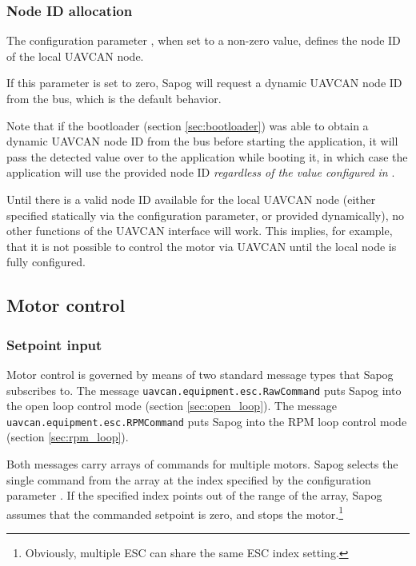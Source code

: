 \documentclass{zubaxdoc}
\begin{document}
\subsubsection{Node ID allocation}

The configuration parameter , when set to a non-zero value,
defines the node ID of the local UAVCAN node.

If this parameter is set to zero, Sapog will request a dynamic UAVCAN node ID from the bus,
which is the default behavior.

Note that if the bootloader (section \ref{sec:bootloader}) was able to obtain a dynamic UAVCAN node ID
from the bus before starting the application,
it will pass the detected value over to the application while booting it,
in which case the application will use the provided node ID
\emph{regardless of the value configured in }.

Until there is a valid node ID available for the local UAVCAN node (either specified
statically via the configuration parameter, or provided dynamically),
no other functions of the UAVCAN interface will work.
This implies, for example, that it is not possible to control the motor via UAVCAN
until the local node is fully configured.

\subsection{Motor control}

\subsubsection{Setpoint input}

Motor control is governed by means of two standard message types that Sapog subscribes to.
The message \verb|uavcan.equipment.esc.RawCommand| puts Sapog into the open loop control mode
(section \ref{sec:open_loop}).
The message \verb|uavcan.equipment.esc.RPMCommand| puts Sapog into the RPM loop control mode
(section \ref{sec:rpm_loop}).

Both messages carry arrays of commands for multiple motors.
Sapog selects the single command from the array at the index specified by the configuration
parameter .
If the specified index points out of the range of the array,
Sapog assumes that the commanded setpoint is zero, and stops the motor.\footnote{
Obviously, multiple ESC can share the same ESC index setting.}
\end{document}

